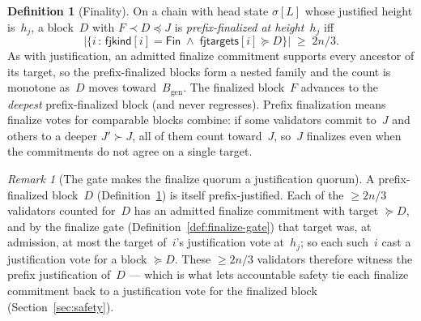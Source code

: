 \ifx\litemode\undefined\documentclass{article}\fi
\newcommand{\genesis}{\ensuremath{B_{\mathrm{gen}}}}
\newcommand{\fjtargets}{\mathsf{fjtargets}}
\newcommand{\fjkind}{\mathsf{fjkind}}
\newcommand{\kfin}{\mathsf{Fin}}
\theoremstyle{plain}
\theoremstyle{definition}
\newtheorem{definition}{Definition}
\theoremstyle{remark}
\newtheorem{remark}[theorem]{Remark}
\begin{document}
\begin{definition}[Finality]\label{def:finality}
On a chain with head state $\sigma[L]$ whose justified height is~$h_j$, a block~$D$ with $F \prec D \preceq J$ is \emph{prefix-finalized at height~$h_j$} iff
\[
  \bigl|\{i \,:\, \fjkind[i] = \kfin \;\wedge\; \fjtargets[i] \succeq D\}\bigr| \;\geq\; 2n/3 .
\]
As with justification, an admitted finalize commitment supports every ancestor of its target, so the prefix-finalized blocks form a nested family and the count is monotone as~$D$ moves toward~$\genesis$.
The finalized block~$F$ advances to the \emph{deepest} prefix-finalized block (and never regresses).
Prefix finalization means finalize votes for comparable blocks combine: if some validators commit to~$J$ and others to a deeper $J' \succ J$, all of them count toward~$J$, so~$J$ finalizes even when the commitments do not agree on a single target.
\end{definition}

\begin{remark}[The gate makes the finalize quorum a justification quorum]\label{rem:gate-prefix-justified}
A prefix-finalized block~$D$ (Definition~\ref{def:finality}) is itself prefix-justified.
Each of the $\geq 2n/3$ validators counted for~$D$ has an admitted finalize commitment with target $\succeq D$, and by the finalize gate (Definition~\ref{def:finalize-gate}) that target was, at admission, at most the target of~$i$'s justification vote at~$h_j$; so each such~$i$ cast a justification vote for a block $\succeq D$.
These $\geq 2n/3$ validators therefore witness the prefix justification of~$D$ --- which is what lets accountable safety tie each finalize commitment back to a justification vote for the finalized block (Section~\ref{sec:safety}).
\end{remark}
\end{document}
